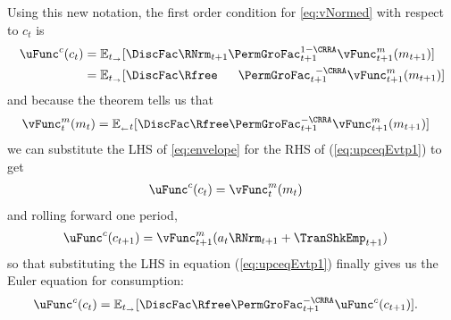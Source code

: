\documentclass[titlepage, headings=optiontotocandhead]{Resources/texmf-local/tex/latex/econtex}
\begin{document}
Using this new notation, the first order condition for \eqref{eq:vNormed} with respect to ${c}_{t}$ is
\begin{equation}\begin{gathered}\begin{aligned}
      \uFunc^{{c}}({c}_{t})  & = \Ex_{t_\rightarrow}[\DiscFac \RNrm_{t+1}\PermGroFac_{t+1}^{1-\CRRA}{\vFunc}^{{m}}_{{t+1}}({m}_{t+1})]  \label{eq:upceqEvtp1}
      \\                        & =  \Ex_{t_\rightarrow}[\DiscFac\Rfree\phantom{._{t+1}}\PermGroFac_{t+1}^{\phantom{1}-\CRRA}{\vFunc}^{{m}}_{{t+1}}({m}_{t+1})]
    \end{aligned}\end{gathered}\end{equation}
and because the  theorem tells us that
\begin{equation}\begin{gathered}\begin{aligned}
      {\vFunc}^{{m}}_{{t}}({m}_{t})  & =  \Ex_{_\leftarrow t} [\DiscFac\Rfree\PermGroFac_{t+1}^{-\CRRA}{\vFunc}^{{m}}_{{t+1}}({m}_{t+1})] \label{eq:envelope}
    \end{aligned}\end{gathered}\end{equation}
we can substitute the LHS of \eqref{eq:envelope} for the RHS of
(\ref{eq:upceqEvtp1}) to get
  \begin{equation}\begin{gathered}\begin{aligned}
        \uFunc^{{c}}({c}_{t})  & = {\vFunc}^{{m}}_{{t}}({m}_{t})\label{eq:upcteqvtp}
      \end{aligned}\end{gathered}\end{equation}
and rolling forward one {period},
\begin{equation}\begin{gathered}\begin{aligned}
      \uFunc^{{c}}({c}_{t+1})  & = {\vFunc}^{{m}}_{{t+1}}({a}_{t}\RNrm_{t+1}+\TranShkEmp_{t+1}) \label{eq:upctp1EqVpxtp1}
    \end{aligned}\end{gathered}\end{equation}
so that substituting the LHS in equation (\ref{eq:upceqEvtp1}) finally gives us the Euler equation for consumption:
  \begin{equation}\begin{gathered}\begin{aligned}
        \uFunc^{{c}}({c}_{t})  & = \Ex_{t_\rightarrow}[\DiscFac\Rfree \PermGroFac_{t+1}^{-\CRRA}\uFunc^{{c}}({c}_{t+1})] \label{eq:cEuler}.
      \end{aligned}\end{gathered}\end{equation}
\end{document}
